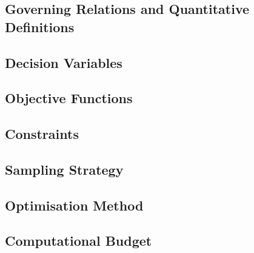 \subsection{Governing Relations and Quantitative Definitions}
\label{sec:res-opt-spec-governing-relations}

%

\subsection{Decision Variables}
\label{sec:res-opt-spec-decision-variables}


\subsection{Objective Functions}
\label{sec:res-opt-spec-objective-functions}


\subsection{Constraints}
\label{sec:res-opt-spec-constraints}


\subsection{Sampling Strategy}
\label{sec:res-opt-spec-sampling-strategy}


\subsection{Optimisation Method}
\label{sec:res-opt-spec-optimisation-method}


\subsection{Computational Budget}
\label{sec:res-opt-spec-computational-budget}

